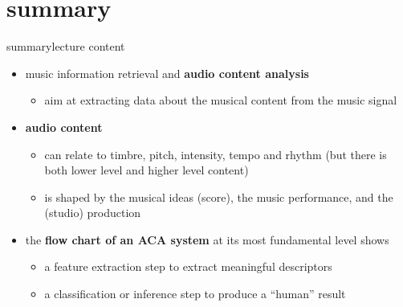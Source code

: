     \section{summary}
        \begin{frame}{summary}{lecture content}
            \begin{itemize}
                \item   music information retrieval and \textbf{audio content analysis} 
                    \begin{itemize}
                        \item   aim at extracting data about the musical content from the music signal
                    \end{itemize}
                \bigskip
                \item      \textbf{audio content}
                    \begin{itemize}
                        \item   can relate to timbre, pitch, intensity, tempo and rhythm (but there is both lower level and higher level content)
                        \item   is shaped by the musical ideas (score), the music performance, and the (studio) production
                    \end{itemize}
                \bigskip
                \item   the \textbf{flow chart of an ACA system} at its most fundamental level shows
                    \begin{itemize}
                        \item   a feature extraction step to extract meaningful descriptors
                        \item   a classification or inference step to produce a ``human'' result
                    \end{itemize}
            \end{itemize}
        \end{frame}

